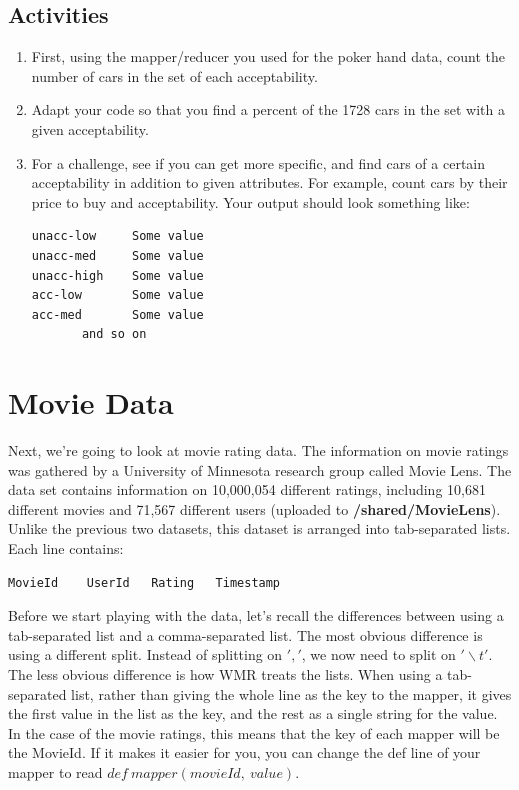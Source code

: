 \documentclass[letterpaper,10pt,openany,oneside]{sphinxmanual}
\begin{document}
\subsection{Activities}
\label{WmrActivities/WmrActivities:id1}\begin{enumerate}
\item {} 
First, using the mapper/reducer you used for the poker hand
data, count the number of cars in the set of each acceptability.

\item {} 
Adapt your code so that you find a percent of the 1728 cars in
the set with a given acceptability.

\item {} 
For a challenge, see if you can get more specific, and find cars
of a certain acceptability in addition to given attributes. For
example, count cars by their price to buy and acceptability. Your
output should look something like:

\begin{Verbatim}[commandchars=\\\{\}]
unacc-low     Some value
unacc-med     Some value
unacc-high    Some value
acc-low       Some value
acc-med       Some value
       and so on
\end{Verbatim}

\end{enumerate}


\section{Movie Data}
\label{WmrActivities/WmrActivities:movie-data}
Next, we're going to look at movie rating data. The information on
movie ratings was gathered by a University of Minnesota research
group called Movie Lens. The data set contains information on
10,000,054 different ratings, including 10,681 different movies and
71,567 different users (uploaded to \textbf{/shared/MovieLens}). Unlike the previous two datasets, this
dataset is arranged into tab-separated lists. Each line contains:

\begin{Verbatim}[commandchars=\\\{\}]
MovieId    UserId   Rating   Timestamp
\end{Verbatim}

Before we start playing with the data, let's recall the differences
between using a tab-separated list and a comma-separated list. The
most obvious difference is using a different split. Instead of
splitting on $','$, we now need to split on
$'\backslash t'$. The less obvious difference is how WMR
treats the lists. When using a tab-separated list, rather than
giving the whole line as the key to the mapper, it gives the first
value in the list as the key, and the rest as a single string for
the value. In the case of the movie ratings, this means that the
key of each mapper will be the MovieId. If it makes it easier for
you, you can change the def line of your mapper to read
$def \ mapper(movieId, \ value)$.
\end{document}

